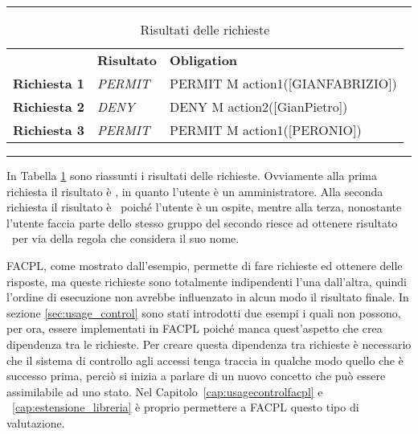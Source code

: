 \begin{table}[H]
\centering
\caption{Risultati delle richieste}
\label{tab:risultati_richieste}
\hrule
\begin{tabular}{lll}
 & \textbf{Risultato} & \textbf{Obligation} \\
\textbf{Richiesta 1} & \textit{PERMIT} & PERMIT M action1({[}GIANFABRIZIO{]}) \\
\textbf{Richiesta 2} & \textit{DENY} & DENY M action2({[}GianPietro{]}) \\
\textbf{Richiesta 3} & \textit{PERMIT} & PERMIT M action1({[}PERONIO{]})
\end{tabular}
\hrule
\end{table}
In Tabella \ref{tab:risultati_richieste} sono riassunti i risultati delle richieste. Ovviamente alla prima richiesta il risultato è \permit, in quanto l'utente è un amministratore. Alla seconda richiesta il risultato è \deny \ poiché l'utente è un ospite, mentre alla terza, nonostante l'utente faccia parte dello stesso gruppo del secondo riesce ad ottenere risultato \permit \ per via della regola che considera il suo nome.\\ \par
FACPL, come mostrato dall'esempio, permette di fare richieste ed ottenere delle risposte, ma queste richieste sono totalmente indipendenti l'una dall'altra, quindi l'ordine di esecuzione non avrebbe influenzato in alcun modo il risultato finale.
In sezione \ref{sec:usage_control} sono stati introdotti due esempi i quali non possono, per ora, essere implementati in FACPL poiché manca quest'aspetto che crea dipendenza tra le richieste.
Per creare questa dipendenza tra richieste è necessario che il sistema di controllo agli accessi tenga traccia in qualche modo quello che è successo prima, perciò si inizia a parlare di un nuovo concetto che può essere assimilabile ad uno stato. Nel Capitolo~\ref{cap:usagecontrolfacpl} e ~\ref{cap:estensione_libreria} è proprio permettere a FACPL questo tipo di valutazione.

